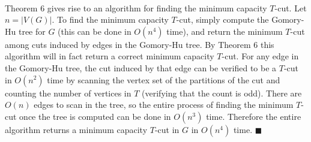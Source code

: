\documentclass[letterpaper,12pt,oneside,onecolumn]{article}
\begin{document}
\paragraph{}
Theorem $6$ gives rise to an algorithm for finding the minimum capacity $T$-cut. Let $n = |V(G)|$. To find the minimum capacity $T$-cut, simply compute the Gomory-Hu tree for $G$ (this can be done in $O(n^4)$ time), and return the minimum $T$-cut among cuts induced by edges in the Gomory-Hu tree. By Theorem $6$ this algorithm will in fact return a correct minimum capacity $T$-cut. For any edge in the Gomory-Hu tree, the cut induced by that edge can be verified to be a $T$-cut in $O(n^2)$ time by scanning the vertex set of the partitions of the cut and counting the number of vertices in $T$ (verifying that the count is odd). There are $O(n)$ edges to scan in the tree, so the entire process of finding the minimum $T$-cut once the tree is computed can be done in $O(n^3)$ time. Therefore the entire algorithm returns a minimum capacity $T$-cut in $G$ in $O(n^4)$ time. $\blacksquare$
\end{document}
